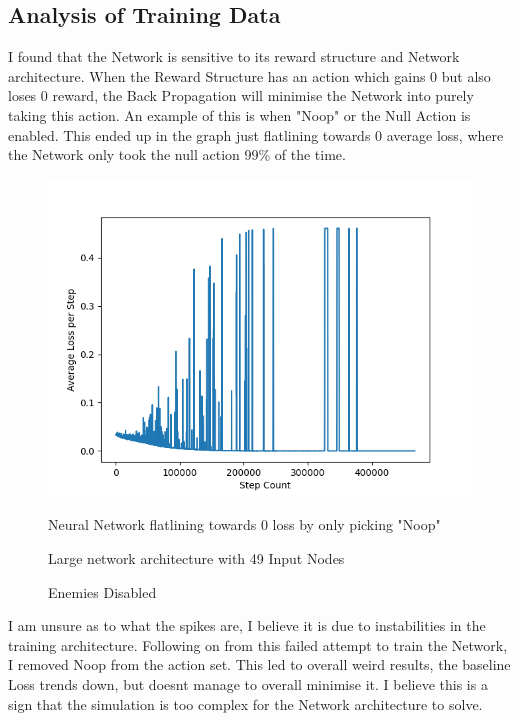 \begin{flushleft}
            \vspace{0.5cm}   

        \vspace{0.5cm}
    \subsection{Analysis of Training Data}
        I found that the Network is sensitive to its reward structure and Network architecture. When the Reward Structure has an action which
        gains 0 but also loses 0 reward, the Back Propagation will minimise the Network into purely taking this action. An example of this
        is when "Noop" or the Null Action is enabled. This ended up in the graph just flatlining towards 0 average loss, where the Network
        only took the null action 99\% of the time. 

        \begin{figure}[H]
            \centering
            \includegraphics[width=12cm]{Images/Evaluation/NullActionFlatline.png}
            \caption*{Neural Network flatlining towards 0 loss by only picking "Noop"}
            \caption*{Large network architecture with 49 Input Nodes} 
            \caption*{Enemies Disabled}
        \end{figure}

        I am unsure as to what the spikes are, I believe it is due to instabilities in the training architecture. Following on from this failed attempt
        to train the Network, I removed Noop from the action set. This led to overall weird results, the baseline Loss trends down, but doesnt manage to
        overall minimise it. I believe this is a sign that the simulation is too complex for the Network architecture to solve. 


\end{flushleft}
